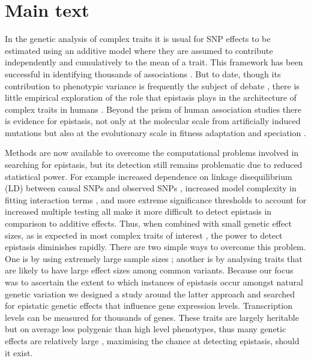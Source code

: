 \documentclass{article}
\begin{document}
\section*{Main text}

In the genetic analysis of complex traits it is usual for SNP effects to be estimated using an additive model where they are assumed to contribute independently and cumulatively to the mean of a trait. This framework has been successful in identifying thousands of associations \cite{Visscher2012}. But to date, though its contribution to phenotypic variance is frequently the subject of debate \cite{Carlborg2004, Hill2008a, Crow2010}, there is little empirical exploration of the role that epistasis plays in the architecture of complex traits in humans \cite{Strange2010, Evans2011}. Beyond the prism of human association studies there is evidence for epistasis, not only at the molecular scale from artificially induced mutations \cite{Costanzo2010} but also at the evolutionary scale in fitness adaptation \cite{Weinreich2006} and speciation \cite{Breen2012}.

Methods are now available to overcome the computational problems involved in searching for epistasis, but its detection still remains problematic due to reduced statistical power. For example increased dependence on linkage disequilibrium (LD) between causal SNPs and observed SNPs \cite{Weir2008, Hemani2013}, increased model complexity in fitting interaction terms \cite{Marchini2005}, and more extreme significance thresholds to account for increased multiple testing \cite{Cordell2009} all make it more difficult to detect epistasis in comparison to additive effects. Thus, when combined with small genetic effect sizes, as is expected in most complex traits of interest \cite{Visscher2012}, the power to detect epistasis diminishes rapidly. There are two simple ways to overcome this problem. One is by using extremely large sample sizes \cite{LangoAllen2010}; another is by analysing traits that are likely to have large effect sizes among common variants. Because our focus was to ascertain the extent to which instances of epistasis occur amongst natural genetic variation we designed a study around the latter approach and searched for epistatic genetic effects that influence gene expression levels. Transcription levels can be measured for thousands of genes. These traits are largely heritable but on average less polygenic than high level phenotypes, thus many genetic effects are relatively large \cite{Powell2013}, maximising the chance at detecting epistasis, should it exist.
\end{document}
